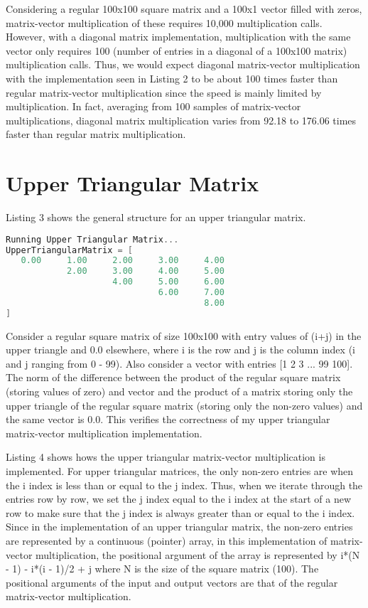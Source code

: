 \documentclass{article}
\begin{document}
Considering a regular 100x100 square matrix and a 100x1 vector filled with zeros, matrix-vector multiplication of these requires 10,000 multiplication calls. However, with a diagonal matrix implementation, multiplication with the same vector only requires 100 (number of entries in a diagonal of a 100x100 matrix) multiplication calls. Thus, we would expect diagonal matrix-vector multiplication with the implementation seen in Listing 2 to be about 100 times faster than regular matrix-vector multiplication since the speed is mainly limited by multiplication. In fact, averaging from 100 samples of matrix-vector multiplications, diagonal matrix multiplication varies from 92.18 to 176.06 times faster than regular matrix multiplication.

\section{Upper Triangular Matrix}

Listing 3 shows the general structure for an upper triangular matrix.

\begin{lstlisting}[language=C, basicstyle=\ttfamily, caption={Upper Triangular Matrix Output.}]
Running Upper Triangular Matrix...
UpperTriangularMatrix = [
   0.00     1.00     2.00     3.00     4.00  
            2.00     3.00     4.00     5.00  
                     4.00     5.00     6.00  
                              6.00     7.00  
                                       8.00  
]
\end{lstlisting}

Consider a regular square matrix of size 100x100 with entry values of (i+j) in the upper triangle and 0.0 elsewhere, where i is the row and j is the column index (i and j ranging from 0 - 99). Also consider a vector with entries [1 2 3 ... 99 100]. The norm of the difference between the product of the regular square matrix (storing values of zero) and vector and the product of a matrix storing only the upper triangle of the regular square matrix (storing only the non-zero values) and the same vector is 0.0. This verifies the correctness of my upper triangular matrix-vector multiplication implementation.

Listing 4 shows hows the upper triangular matrix-vector multiplication is implemented. For upper triangular matrices, the only non-zero entries are when the i index is less than or equal to the j index. Thus, when we iterate through the entries row by row, we set the j index equal to the i index at the start of a new row to make sure that the j index is always greater than or equal to the i index. Since in the implementation of an upper triangular matrix, the non-zero entries are represented by a continuous (pointer) array, in this implementation of matrix-vector multiplication, the positional argument of the array is represented by i*(N - 1) - i*(i - 1)/2 + j where N is the size of the square matrix (100). The positional arguments of the input and output vectors are that of the regular matrix-vector multiplication. 
\end{document}
